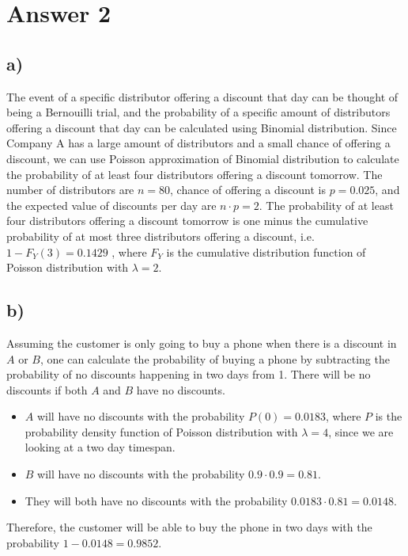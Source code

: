 \documentclass[12pt]{article}
\begin{document}
\newpage

\section*{Answer 2}

\subsection*{a)} 

The event of a specific distributor offering a discount that day can be thought
of being a Bernouilli trial, and the probability of a specific amount of
distributors offering a discount that day can be calculated using Binomial
distribution.
Since Company A has a large amount of distributors and a small chance of
offering a discount, we can use Poisson approximation of Binomial distribution
to calculate the probability of at least four distributors offering a discount
tomorrow.
\newline
The number of distributors are $n = 80$, chance of offering a discount is
$p = 0.025$, and the expected value of discounts per day are $n \cdot p = 2$.
The probability of at least four distributors offering a discount tomorrow is
one minus the cumulative probability of at most three distributors offering a
discount, i.e. $1 - F_Y(3) = 0.1429$ , where $F_Y$ is the cumulative
distribution function of Poisson distribution with $\lambda = 2$.

\subsection*{b)} 

Assuming the customer is only going to buy a phone when there is a discount
in $A$ or $B$, one can calculate the probability of buying a phone by
subtracting the probability of no discounts happening in two days from 1.
\newline
There will be no discounts if both $A$ and $B$ have no discounts.
\begin{itemize}
    \item $A$ will have no discounts with the probability $P(0) = 0.0183$,
    where $P$ is the probability density function of Poisson distribution with
    $\lambda = 4$, since we are looking at a two day timespan.
    \item $B$ will have no discounts with the probability
    $0.9 \cdot 0.9 = 0.81$.
    \item They will both have no discounts with the probability
    $0.0183 \cdot 0.81 = 0.0148$.
\end{itemize}
Therefore, the customer will be able to buy the phone in two days with the
probability $1 - 0.0148 = 0.9852$.
\end{document}
